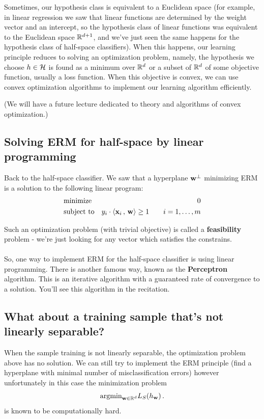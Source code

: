 Sometimes, our hypothesis class is equivalent to a Euclidean space (for example, in
  linear regression we saw that linear functions are determined by the weight
  vector and an intercept, so the hypothesis class of linear functions was equivalent to 
the Euclidean space $\mathbb{R}^{d+1}$, and we've just seen the same happens for
the hypothesis class of half-space classifiers). When this happens, our learning
principle reduces to solving an optimization problem, namely, the hypothesis we
choose $h\in\mathcal{H}$ is found as a minimum over $\mathbb{R}^d$ or a subset of $\mathbb{R}^d$
of some objective function, usually a loss function. When this objective is convex,
we can use convex optimization algorithms to implement our learning algorithm
 efficiently. 

(We will have a future lecture dedicated to theory and
algorithms of convex
optimization.)

\subsection{Solving ERM for half-space by linear programming}

Back to the half-space classifier. 
We saw that a hyperplane $\mathbf{w}^\perp$ minimizing ERM is a solution to the
following linear program:
 \begin{eqnarray*}
      & \text{minimize}   & 0 \\
     & \text{subject to} &  y_i \cdot  {\left\langle \mathbf{x}_i\,,\,\mathbf{w} \right\rangle}
       \geq 1  \qquad 
i=1,\ldots,m
    \end{eqnarray*}

    Such an optimization problem (with trivial objective) is called a {\bf
    feasibility} problem - we're just looking for any vector which satisfies the
    constrains. 
\\~\\
So, one way to implement ERM for the half-space classifier is using linear
programming. There is another famous way, known as the {\bf Perceptron} algorithm.
This is an iterative algorithm with a guaranteed rate of convergence to a
solution. You'll see this algorithm in the recitation.


\subsection{What about a training sample that's not linearly separable?}

When the sample training is not linearly separable, the optimization problem
above has no solution. We can still try to implement the ERM principle (find a
hyperplane with minimal number of misclassification errors) however
unfortunately in this case 
the minimization problem 
\[  \text{argmin}_{\mathbf{w}\in\mathbb{R}^d} L_S(h_{\mathbf{w}})\,.\]
is known to be  computationally hard. 




